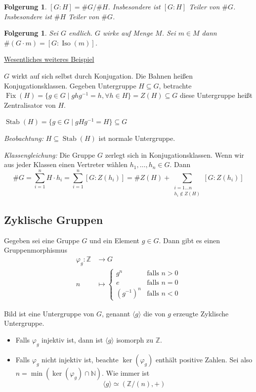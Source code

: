 \documentclass[a4paper,12pt,numbers=noenddot,parskip=full]{scrartcl}
\newcommand{\setN}{\mathbb{N}}
\newcommand{\setZ}{\mathbb{Z}}
\newcommand{\heading}{\underline}
\theoremstyle{dotless}
\newtheorem{corollary}[theorem]{Folgerung}
\theoremstyle{remark}
\begin{document}
	\begin{corollary}
		$[G:H] = \#G/\#H$. Insbesondere ist $[G:H]$ Teiler von $\#G$. Insbesondere ist $\#H$ Teiler von $\#G$.
	\end{corollary}

	\begin{corollary}
		Sei $G$ endlich. $G$ wirke auf Menge $M$. Sei $m \in M$ dann $\# (G \cdot m) = [G: \operatorname{Iso}(m)]$.
	\end{corollary}
	\newpage
	\heading{Wesentliches weiteres Beispiel}
	
	$G$ wirkt auf sich selbst durch Konjugation. Die Bahnen heißen Konjugationsklassen. Gegeben Untergruppe $H \subseteq G$, betrachte $\operatorname{Fix}(H) = \{ g \in G \mid g h g^{-1} = h, \forall h \in H \} = Z(H) \subseteq G$ diese Untergruppe heißt Zentralisator von $H$.
	
	$\operatorname{Stab}(H) = \{ g \in G \mid g H g^{-1} = H \} \subseteq G$
	
	\textit{Beobachtung:} $H \subseteq \operatorname{Stab}(H)$ ist normale Untergruppe.
	
	\textit{Klassengleichung:} Die Gruppe $G$ zerlegt sich in Konjugationsklassen. Wenn wir aus jeder Klassen einen Vertreter wählen $h_1, \dots, h_n \in G$. Dann
	\begin{equation*}
		\#G = \sum_{i=1}^{n} H \cdot h_i = \sum_{i=1}^{n} [G: Z(h_i)] = \#Z(H) + \sum_{\substack{i = 1 \dots n \\ h_i \notin Z(H)}} [G:Z(h_i)]
	\end{equation*}
	
	\subsection{Zyklische Gruppen}

	Gegeben sei eine Gruppe $G$ und ein Element $g \in G$. Dann gibt es einen Gruppenmorphismus
	\begin{align*}
		\varphi_g: \setZ &\longrightarrow G \\
		n &\longmapsto \begin{cases}
			g^n & \text{falls } n > 0 \\
			e & \text{falls } n = 0 \\
			(g^{-1})^n & \text{falls } n < 0
		\end{cases}
	\end{align*}
	
	Bild ist eine Untergruppe von $G$, genannt $\langle g \rangle$ die von $g$ erzeugte Zyklische Untergruppe.
	\begin{itemize}
		\item Falls $\varphi_g$ injektiv ist, dann ist $\langle g \rangle$ isomorph zu $\setZ$.
		\item Falls $\varphi_g$ nicht injektiv ist, beachte $\ker(\varphi_g)$ enthält positive Zahlen. Sei also $n = \min (\ker(\varphi_g) \cap \setN)$. Wie immer ist
		\begin{equation*}
			\langle g \rangle \simeq (\setZ/(n), +)
		\end{equation*}
	\end{itemize}
\end{document}
